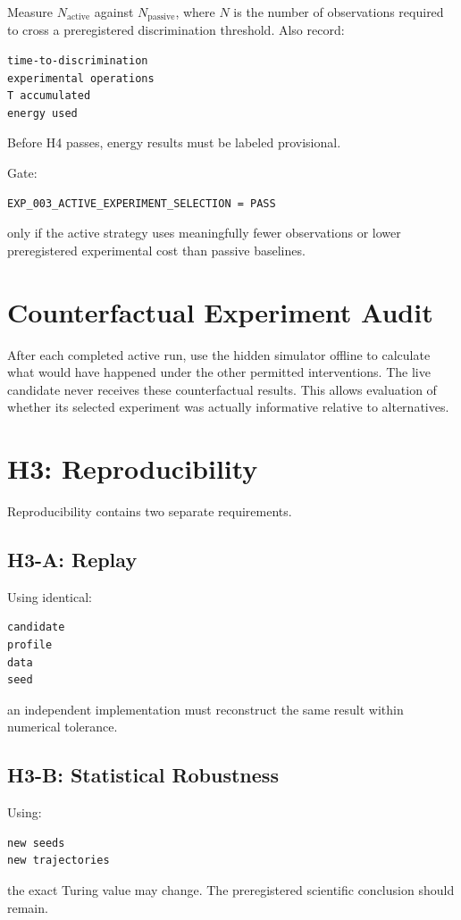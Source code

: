 \documentclass[11pt]{article}
\begin{document}
Measure \(N_{\text{active}}\) against \(N_{\text{passive}}\), where \(N\) is the number of observations required to cross a preregistered discrimination threshold. Also record:
\begin{verbatim}
time-to-discrimination
experimental operations
T accumulated
energy used
\end{verbatim}
Before H4 passes, energy results must be labeled provisional.

Gate:
\begin{verbatim}
EXP_003_ACTIVE_EXPERIMENT_SELECTION = PASS
\end{verbatim}
only if the active strategy uses meaningfully fewer observations or lower preregistered experimental cost than passive baselines.

\section{Counterfactual Experiment Audit}

After each completed active run, use the hidden simulator offline to calculate what would have happened under the other permitted interventions. The live candidate never receives these counterfactual results. This allows evaluation of whether its selected experiment was actually informative relative to alternatives.

\section{H3: Reproducibility}

Reproducibility contains two separate requirements.

\subsection{H3-A: Replay}

Using identical:
\begin{verbatim}
candidate
profile
data
seed
\end{verbatim}
an independent implementation must reconstruct the same result within numerical tolerance.

\subsection{H3-B: Statistical Robustness}

Using:
\begin{verbatim}
new seeds
new trajectories
\end{verbatim}
the exact Turing value may change. The preregistered scientific conclusion should remain.
\end{document}
